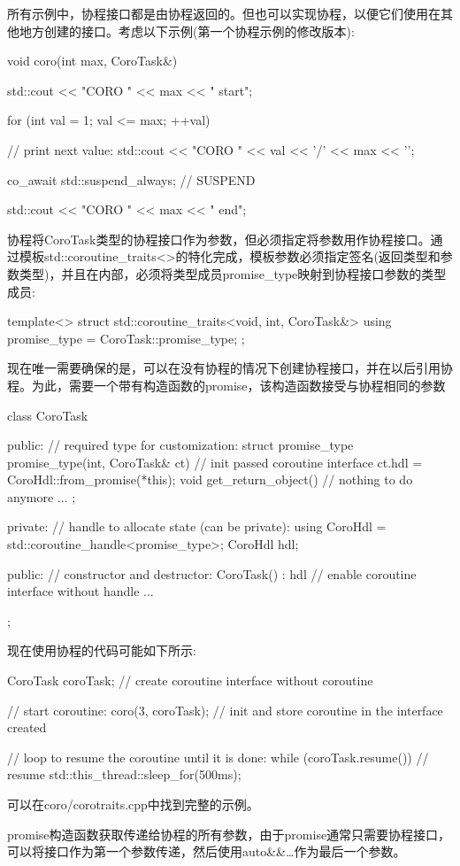 所有示例中，协程接口都是由协程返回的。但也可以实现协程，以便它们使用在其他地方创建的接口。考虑以下示例(第一个协程示例的修改版本):

\begin{cpp}
void coro(int max, CoroTask&)
{
	std::cout << "CORO " << max << " start\n";

	for (int val = 1; val <= max; ++val) {
		// print next value:
		std::cout << "CORO " << val << '/' << max << '\n';

		co_await std::suspend_always{}; // SUSPEND
	}

	std::cout << "CORO " << max << " end\n";
}
\end{cpp}

协程将CoroTask类型的协程接口作为参数，但必须指定将参数用作协程接口。通过模板std::coroutine\_traits<>的特化完成，模板参数必须指定签名(返回类型和参数类型)，并且在内部，必须将类型成员promise\_type映射到协程接口参数的类型成员:

\begin{cpp}
template<>
struct std::coroutine_traits<void, int, CoroTask&>
{
	using promise_type = CoroTask::promise_type;
};
\end{cpp}

现在唯一需要确保的是，可以在没有协程的情况下创建协程接口，并在以后引用协程。为此，需要一个带有构造函数的promise，该构造函数接受与协程相同的参数

\begin{cpp}
class CoroTask {
	public:
	// required type for customization:
	struct promise_type {
		promise_type(int, CoroTask& ct) { // init passed coroutine interface
			ct.hdl = CoroHdl::from_promise(*this);
		}
		void get_return_object() { // nothing to do anymore
		}
		...
	};

private:
	// handle to allocate state (can be private):
	using CoroHdl = std::coroutine_handle<promise_type>;
	CoroHdl hdl;

public:
	// constructor and destructor:
	CoroTask() : hdl{} { // enable coroutine interface without handle
	}
	...
};
\end{cpp}

现在使用协程的代码可能如下所示:

\begin{cpp}
CoroTask coroTask; // create coroutine interface without coroutine

// start coroutine:
coro(3, coroTask); // init and store coroutine in the interface created

// loop to resume the coroutine until it is done:
while (coroTask.resume()) { // resume
	std::this_thread::sleep_for(500ms);
}
\end{cpp}

可以在coro/corotraits.cpp中找到完整的示例。

promise构造函数获取传递给协程的所有参数，由于promise通常只需要协程接口，可以将接口作为第一个参数传递，然后使用auto\&\&…作为最后一个参数。










